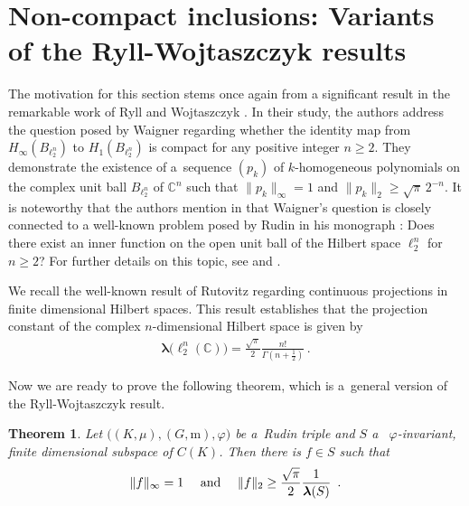 \documentclass[12pt]{amsart}
\numberwithin{subsection}{section}
\newtheorem{theorem}{Theorem}[section]
\theoremstyle{definition}
\theoremstyle{remark}
\begin{document}
\section{Non-compact inclusions: Variants of the Ryll-Wojtaszczyk results}


The motivation for this section stems once again from a significant result in the remarkable work of Ryll and Wojtaszczyk \cite{ryll1983homogeneous}.
In their study, the authors address the question posed by Waigner regarding whether the identity map from  $ H_\infty(B_{\ell_2^n})  $ to  $ H_1(B_{\ell_2^n})  $ is compact for any positive integer  $ n \ge 2  $. They demonstrate the existence of a~sequence  $ (p_k)$ of $k$-homogeneous polynomials on the complex unit ball  $ B_{\ell_2^n}  $ of  $\mathbb{C}^n $ such that  $ \|p_k\|_{\infty} = 1$ and  $ \|p_k\|_2 \geq \sqrt{\pi}\,2^{-n}$.
It is noteworthy that the authors mention in \cite{ryll1983homogeneous} that Waigner's question is closely connected to a well-known problem posed by Rudin in his monograph \cite{rudin1980}: Does there exist an inner function on the open unit ball of the Hilbert space  $ \ell_2^n$ for $ n \ge 2$? For further details on this topic, see \cite{rudin1985} and \cite{wojtaszczyk1996banach}.

We recall the well-known result of Rutovitz \cite{rutovitz} regarding continuous projections in finite dimensional Hilbert spaces. This result establishes that the projection constant of the complex $ n $-dimensional Hilbert space is given by
\begin{align}
\label{Ruto}
\boldsymbol{\lambda}\big(\ell_2^n(\mathbb{C})\big) = \frac{\sqrt{\pi}}{2} \frac{n!}{\Gamma\left(n + \frac{1}{2}\right)}\,.
\end{align}


Now we are ready to prove the following theorem, which is a~general version of the Ryll-Wojtaszczyk result.

\medskip

\begin{theorem} \label{Ryll-Wojtaszczyk- polynomials}
Let  $\big((K,\mu),(G,\mathrm{m}),\varphi\big) $ be a~Rudin triple and  $S $ a~ $\varphi $-invariant, finite dimensional subspace of   $C(K) $.
Then there is  $f \in S $ such that
\[
\text{$\|f\|_\infty = 1 $ \quad and \quad  $\|f\|_2 \ge \frac{\sqrt{\pi}}{2}   \frac{1}{\boldsymbol{\lambda}(S)} $   \,.}
\]
\end{theorem}

\smallskip
\end{document}
